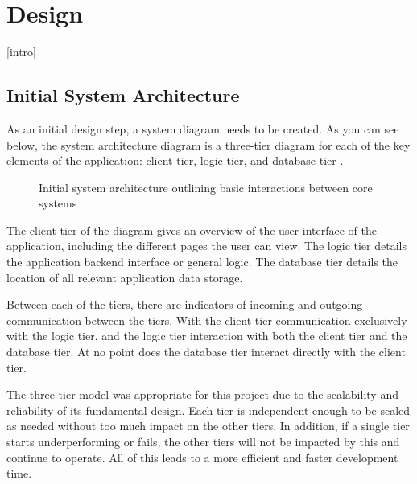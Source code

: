 \documentclass{l4proj}
\begin{document}
\chapter{Design}
[intro]

\section{Initial System Architecture}
As an initial design step, a system diagram needs to be created. As you can see below, the system architecture diagram is a three-tier diagram for each of the key elements of the application: client tier, logic tier, and database tier \citep{aarsten1996patterns}. 

\begin{figure}[H]
    \centering
    \caption{Initial system architecture outlining basic interactions between core systems}
    \label{fig:initial_arch} 
\end{figure}

The client tier of the diagram gives an overview of the user interface of the application, including the different pages the user can view. The logic tier details the application backend interface or general logic. The database tier details the location of all relevant application data storage.
\newline

Between each of the tiers, there are indicators of incoming and outgoing communication between the tiers. With the client tier communication exclusively with the logic tier, and the logic tier interaction with both the client tier and the database tier. At no point does the database tier interact directly with the client tier.
\newline

The three-tier model was appropriate for this project due to the scalability and reliability of its fundamental design. Each tier is independent enough to be scaled as needed without too much impact on the other tiers. In addition, if a single tier starts underperforming or fails, the other tiers will not be impacted by this and continue to operate. All of this leads to a more efficient and faster development time.
\end{document}
